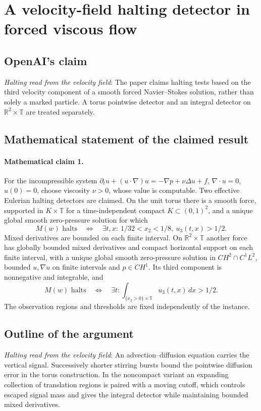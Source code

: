\documentclass[11pt]{article}
\begin{document}
\section*{A velocity-field halting detector in forced viscous flow}

\subsection{OpenAI's claim}
\textit{Halting read from the velocity field}: The paper claims halting tests based on the third velocity component of a smooth forced Navier--Stokes solution, rather than solely a marked particle. A torus pointwise detector and an integral detector on $\mathbb R^2\times\mathbb T$ are treated separately.

\subsection{Mathematical statement of the claimed result}
\paragraph{Mathematical claim 1.} For the incompressible system $\partial_tu+(u\cdot\nabla)u=-\nabla p+\nu\Delta u+f$, $\nabla\cdot u=0$, $u(0)=0$, choose viscosity $\nu>0$, whose value is computable. Two effective Eulerian halting detectors are claimed. On the unit torus there is a smooth force, supported in $K\times\mathbb T$ for a time-independent compact $K\subset(0,1)^2$, and a unique global smooth zero-pressure solution for which \[M(w)\text{ halts}\quad\Longleftrightarrow\quad\exists t,x:\ 1/32<x_2<1/8,\ u_3(t,x)>1/2.\] Mixed derivatives are bounded on each finite interval. On $\mathbb R^2\times\mathbb T$ another force has globally bounded mixed derivatives and compact horizontal support on each finite interval, with a unique global smooth zero-pressure solution in $CH^2\cap C^1L^2$, bounded $u,\nabla u$ on finite intervals and $p\in CH^1$. Its third component is nonnegative and integrable, and \[M(w)\text{ halts}\quad\Longleftrightarrow\quad\exists t:\int_{\{x_2>0\}\times\mathbb T}u_3(t,x)\,dx>1/2.\] The observation regions and thresholds are fixed independently of the instance.

\subsection{Outline of the argument}
\textit{Halting read from the velocity field}: An advection--diffusion equation carries the vertical signal. Successively shorter stirring bursts bound the pointwise diffusion error in the torus construction. In the noncompact variant an expanding collection of translation regions is paired with a moving cutoff, which controls escaped signal mass and gives the integral detector while maintaining bounded mixed derivatives.
\end{document}
